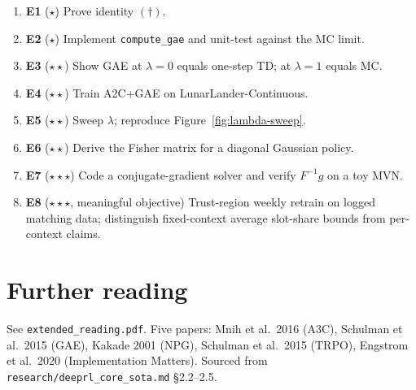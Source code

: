 \documentclass[11pt,oneside]{scrbook}
\begin{document}
\begin{enumerate}[label={},leftmargin=0pt,labelsep=0pt]
  \item \textbf{E1} ($\star$) Prove identity $(\dag)$.
  \item \textbf{E2} ($\star$) Implement \texttt{compute\_gae} and unit-test against the MC limit.
  \item \textbf{E3} ($\star\star$) Show GAE at $\lambda=0$ equals one-step TD; at $\lambda=1$ equals MC.
  \item \textbf{E4} ($\star\star$) Train A2C+GAE on LunarLander-Continuous.
  \item \textbf{E5} ($\star\star$) Sweep $\lambda$; reproduce Figure~\ref{fig:lambda-sweep}.
  \item \textbf{E6} ($\star\star$) Derive the Fisher matrix for a diagonal Gaussian policy.
  \item \textbf{E7} ($\star\star\star$) Code a conjugate-gradient solver and verify $F^{-1}g$ on a toy MVN.
  \item \textbf{E8} ($\star\star\star$, meaningful objective) Trust-region weekly retrain on logged matching data; distinguish fixed-context average slot-share bounds from per-context claims.
\end{enumerate}

\chapter{Further reading}

See \texttt{extended\_reading.pdf}. Five papers: Mnih et al.\ 2016 (A3C), Schulman et al.\ 2015 (GAE), Kakade 2001 (NPG), Schulman et al.\ 2015 (TRPO), Engstrom et al.\ 2020 (Implementation Matters). Sourced from \texttt{research/deeprl\_core\_sota.md} \S 2.2--2.5.
\end{document}
